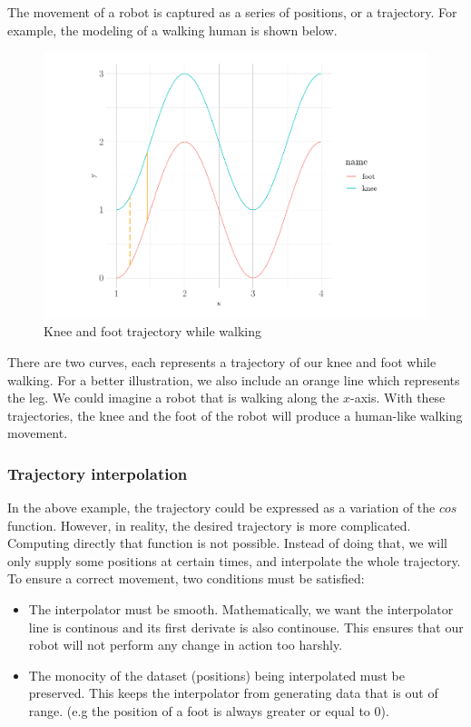 \documentclass[a4paper, xcolor = usenames,dvipsnames]{article}
\providecommand{\tightlist}{%
  \setlength{\itemsep}{0pt}\setlength{\parskip}{0pt}}
\begin{document}
The movement of a robot is captured as a series of positions, or a trajectory. For example, the modeling of a walking human is shown below.

\begin{figure}

{\centering \includegraphics{report_files/figure-latex/human-plot-1} 

}

\caption{Knee and foot trajectory while walking}\label{fig:human-plot}
\end{figure}

There are two curves, each represents a trajectory of our knee and foot while walking. For a better illustration, we also include an orange line which represents the leg. We could imagine a robot that is walking along the \(x\)-axis. With these trajectories, the knee and the foot of the robot will produce a human-like walking movement.

\hypertarget{trajectory-interpolation}{%
\subsubsection{Trajectory interpolation}\label{trajectory-interpolation}}

In the above example, the trajectory could be expressed as a variation of the \(cos\) function. However, in reality, the desired trajectory is more complicated. Computing directly that function is not possible. Instead of doing that, we will only supply some positions at certain times, and interpolate the whole trajectory. To ensure a correct movement, two conditions must be satisfied:

\begin{itemize}
\tightlist
\item
  The interpolator must be smooth. Mathematically, we want the interpolator line is continous and its first derivate is also continouse. This ensures that our robot will not perform any change in action too harshly.
\item
  The monocity of the dataset (positions) being interpolated must be preserved. This keeps the interpolator from generating data that is out of range. (e.g the position of a foot is always greater or equal to \(0\)).
\end{itemize}
\end{document}
